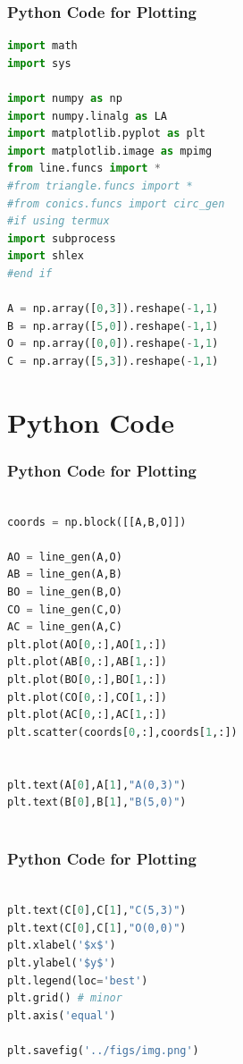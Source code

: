 \documentclass{beamer}
\theoremstyle{remark}
\numberwithin{equation}{section}
\begin{document}
\begin{frame}[fragile]
\frametitle{Python Code for Plotting}
\begin{lstlisting}[language=Python]
    import math
import sys   

import numpy as np
import numpy.linalg as LA
import matplotlib.pyplot as plt
import matplotlib.image as mpimg
from line.funcs import *
#from triangle.funcs import *
#from conics.funcs import circ_gen
#if using termux
import subprocess
import shlex
#end if

A = np.array([0,3]).reshape(-1,1)
B = np.array([5,0]).reshape(-1,1)
O = np.array([0,0]).reshape(-1,1)
C = np.array([5,3]).reshape(-1,1)

\end{lstlisting}

\end{frame}
\section{Python Code}
\begin{frame}[fragile]
\frametitle{Python Code for Plotting}
\begin{lstlisting}[language=Python]   

coords = np.block([[A,B,O]])

AO = line_gen(A,O)
AB = line_gen(A,B)
BO = line_gen(B,O)
CO = line_gen(C,O)
AC = line_gen(A,C)
plt.plot(AO[0,:],AO[1,:])
plt.plot(AB[0,:],AB[1,:])
plt.plot(BO[0,:],BO[1,:])
plt.plot(CO[0,:],CO[1,:])
plt.plot(AC[0,:],AC[1,:])
plt.scatter(coords[0,:],coords[1,:])


plt.text(A[0],A[1],"A(0,3)")
plt.text(B[0],B[1],"B(5,0)")



\end{lstlisting}

\end{frame}
\begin{frame}[fragile]
\frametitle{Python Code for Plotting}
\begin{lstlisting}[language=Python]   

plt.text(C[0],C[1],"C(5,3)")
plt.text(C[0],C[1],"O(0,0)")
plt.xlabel('$x$')
plt.ylabel('$y$')
plt.legend(loc='best')
plt.grid() # minor
plt.axis('equal')

plt.savefig('../figs/img.png')


\end{lstlisting}

\end{frame}
\end{document}
